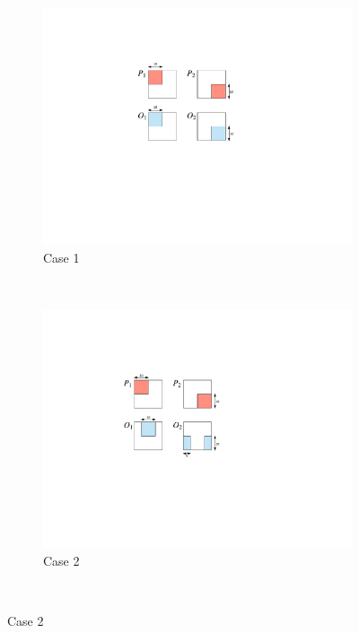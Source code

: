 \documentclass[conference]{IEEEtran}
\begin{document}
	\begin{figure}
		\centering
		\begin{subfigure}[b]{0.15\textwidth}
			\includegraphics[width=\textwidth]{./img/case1-2}
			\caption{Case 1}
			\label{fig:case1}
		\end{subfigure}
		~ %
		\begin{subfigure}[b]{0.15\textwidth}
			\includegraphics[width=\textwidth]{./img/case2-2}
			\caption{Case 2}
			\label{fig:case2}
		\end{subfigure}
		~ %

\end{figure}
\end{document}
